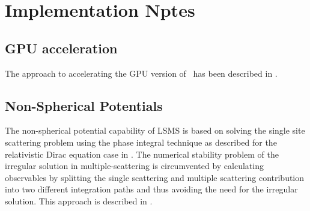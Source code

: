 \chapter{Implementation Nptes}
\section{GPU acceleration}
The approach to accelerating the GPU version of \LSMS\ has been described in
\cite{Eisenbach2017}.

\section{Non-Spherical Potentials}
The non-spherical potential capability of LSMS is based on solving the single site scattering
problem using the phase integral technique as described for the relativistic Dirac equation
case in \cite{Liu2016}. The numerical stability problem of the irregular solution in
multiple-scattering is circumvented by calculating observables by splitting the
single scattering and multiple scattering contribution into two different integration paths
and thus avoiding the need for the irregular solution. This approach is described in \cite{Liu2018}.

